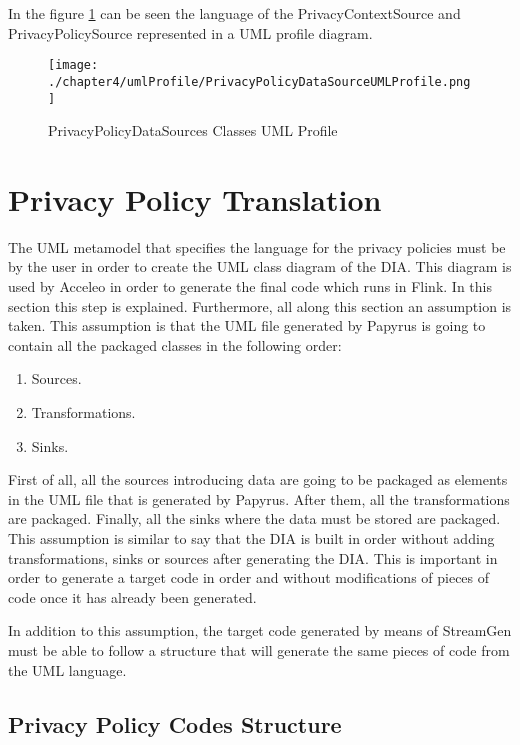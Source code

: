 In the figure \ref{fig:PrivacyPolicyDataSources Classes UML Profile} can be seen the language of the PrivacyContextSource and PrivacyPolicySource represented in a UML profile diagram.

\begin{figure}
\centering
{\texttt{[image: ./chapter4/umlProfile/PrivacyPolicyDataSourceUMLProfile.png]}}
\caption{PrivacyPolicyDataSources Classes UML Profile}
\label{fig:PrivacyPolicyDataSources Classes UML Profile}
\end{figure}

\section{Privacy Policy Translation}

The UML metamodel that specifies the language for the privacy policies must be by the user in order to create the UML class diagram of the DIA. This diagram is used by Acceleo in order to generate the final code which runs in Flink. In this section this step is explained. Furthermore, all along this section an assumption is taken. This assumption is that the UML file generated by Papyrus is going to contain all the packaged classes in the following order:

\begin{enumerate}
\item Sources.
\item Transformations.
\item Sinks.
\end{enumerate}

First of all, all the sources introducing data are going to be packaged as elements in the UML file that is generated by Papyrus. After them, all the transformations are packaged. Finally, all the sinks where the data must be stored are packaged. This assumption is similar to say that the DIA is built in order without adding transformations, sinks or sources after generating the DIA. This is important in order to generate a target code in order and without modifications of pieces of code once it has already been generated.

In addition to this assumption, the target code generated by means of StreamGen must be able to follow a structure that will generate the same pieces of code from the UML language.

\subsection{Privacy Policy Codes Structure}

